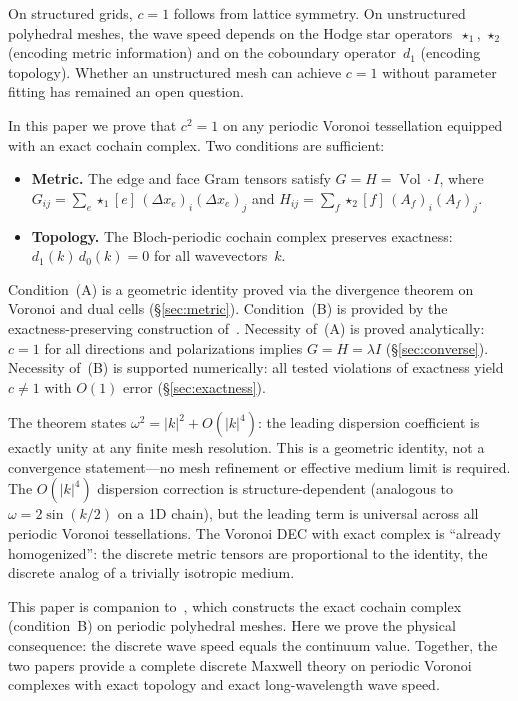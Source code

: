 \documentclass[preprint,12pt]{elsarticle}
\DeclareMathOperator{\Vol}{Vol}
\begin{document}
On structured grids, $c = 1$ follows from lattice symmetry. On unstructured
polyhedral meshes, the wave speed depends on the Hodge star
operators~$\star_1$, $\star_2$ (encoding metric information) and on the
coboundary operator~$d_1$ (encoding topology). Whether an unstructured mesh
can achieve $c = 1$ without parameter fitting has remained an open question.

In this paper we prove that $c^2 = 1$ on any periodic Voronoi tessellation
equipped with an exact cochain complex. Two conditions are sufficient:
\begin{itemize}
\item[\textbf{(A)}] \textbf{Metric.} The edge and face Gram tensors satisfy
  $G = H = \Vol \cdot I$, where
  $G_{ij} = \sum_e \star_1[e]\, (\Delta x_e)_i (\Delta x_e)_j$ and
  $H_{ij} = \sum_f \star_2[f]\, (A_f)_i (A_f)_j$.
\item[\textbf{(B)}] \textbf{Topology.} The Bloch-periodic cochain complex
  preserves exactness: $d_1(k)\, d_0(k) = 0$ for all wavevectors~$k$.
\end{itemize}
Condition~(A) is a geometric identity proved via the divergence theorem on
Voronoi and dual cells (\S\ref{sec:metric}). Condition~(B) is provided by
the exactness-preserving construction of~\cite{paper1}. Necessity of~(A) is
proved analytically: $c = 1$ for all directions and polarizations implies
$G = H = \lambda I$ (\S\ref{sec:converse}). Necessity of~(B) is supported
numerically: all tested violations of exactness yield $c \neq 1$ with $O(1)$
error (\S\ref{sec:exactness}).

The theorem states $\omega^2 = |k|^2 + O(|k|^4)$: the leading dispersion
coefficient is exactly unity at any finite mesh resolution. This is a
geometric identity, not a convergence statement---no mesh refinement or
effective medium limit is required. The $O(|k|^4)$ dispersion correction is
structure-dependent (analogous to $\omega = 2\sin(k/2)$ on a 1D chain), but
the leading term is universal across all periodic Voronoi tessellations. The
Voronoi DEC with exact complex is ``already homogenized'': the discrete
metric tensors are proportional to the identity, the discrete analog of a
trivially isotropic medium.

This paper is companion to~\cite{paper1}, which constructs the exact cochain
complex (condition~B) on periodic polyhedral meshes. Here we prove the
physical consequence: the discrete wave speed equals the continuum value.
Together, the two papers provide a complete discrete Maxwell theory on
periodic Voronoi complexes with exact topology and exact long-wavelength
wave speed.
\end{document}
